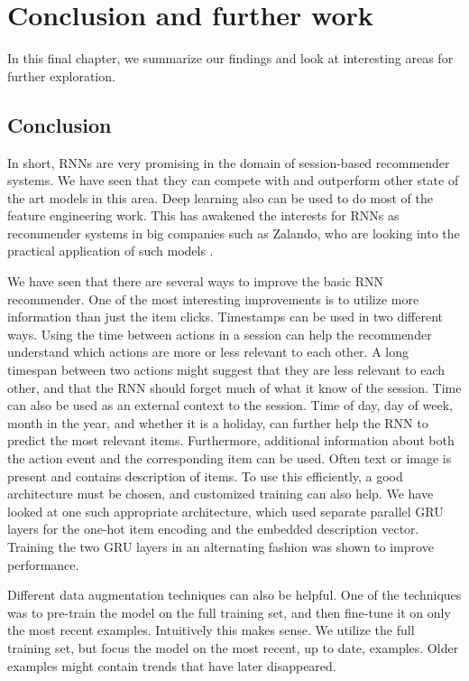 \chapter{Conclusion and further work}
In this final chapter, we summarize our findings and look at interesting areas for further exploration.

\section{Conclusion}
In short, RNNs are very promising in the domain of session-based recommender systems. We have seen that they can compete with and outperform other state of the art models in this area. Deep learning also can be used to do most of the feature engineering work. This has awakened the interests for RNNs as recommender systems in big companies such as Zalando, who are looking into the practical application of such models \cite{ZALANDO:understanding-consumer-histories}. 

We have seen that there are several ways to improve the basic RNN recommender. One of the most interesting improvements is to utilize more information than just the item clicks. Timestamps can be used in two different ways. Using the time between actions in a session can help the recommender understand which actions are more or less relevant to each other. A long timespan between two actions might suggest that they are less relevant to each other, and that the RNN should forget much of what it know of the session. Time can also be used as an external context to the session. Time of day, day of week, month in the year, and whether it is a holiday, can further help the RNN to predict the most relevant items. Furthermore, additional information about both the action event and the corresponding item can be used. Often text or image is present and contains description of items. To use this efficiently, a good architecture must be chosen, and customized training can also help. We have looked at one such appropriate architecture, which used separate parallel GRU layers for the one-hot item encoding and the embedded description vector. Training the two GRU layers in an alternating fashion was shown to improve performance.

Different data augmentation techniques can also be helpful. One of the techniques was to pre-train the model on the full training set, and then fine-tune it on only the most recent examples. Intuitively this makes sense. We utilize the full training set, but focus the model on the most recent, up to date, examples. Older examples might contain trends that have later disappeared. 

